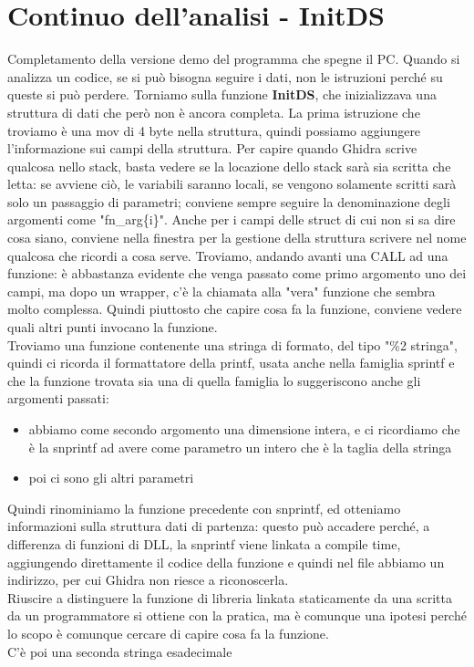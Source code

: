 \documentclass[12pt, oneside]{extbook}
\begin{document}
\section{Continuo dell'analisi - InitDS}
Completamento della versione demo del programma che spegne il PC. Quando si analizza un codice, se si può bisogna seguire i dati, non le istruzioni perché su queste si può perdere. Torniamo sulla funzione \textbf{InitDS}, che inizializzava una struttura di dati che però non è ancora completa. La prima istruzione che troviamo è una mov di 4 byte nella struttura, quindi possiamo aggiungere l'informazione sui campi della struttura. Per capire quando Ghidra scrive qualcosa nello stack, basta vedere se la locazione dello stack sarà sia scritta che letta: se avviene ciò, le variabili saranno locali, se vengono solamente scritti sarà solo un passaggio di parametri; conviene sempre seguire la denominazione degli argomenti come "\textsf{fn\_arg\{i\}}". Anche per i campi delle struct di cui non si sa dire cosa siano, conviene nella finestra per la gestione della struttura scrivere nel nome qualcosa che ricordi a cosa serve. Troviamo, andando avanti una CALL ad una funzione: è abbastanza evidente che venga passato come primo argomento uno dei campi, ma dopo un wrapper, c'è la chiamata alla "vera" funzione che sembra molto complessa. Quindi piuttosto che capire cosa fa la funzione, conviene vedere quali altri punti invocano la funzione. \\ Troviamo una funzione contenente una stringa di formato, del tipo "\%2 stringa", quindi ci ricorda il formattatore della printf, usata anche nella famiglia sprintf e che la funzione trovata sia una di quella famiglia lo suggeriscono anche gli argomenti passati:
\begin{itemize}
\item abbiamo come secondo argomento una dimensione intera, e ci ricordiamo che è la snprintf ad avere come parametro un intero che è la taglia della stringa
\item poi ci sono gli altri parametri
\end{itemize}
Quindi rinominiamo la funzione precedente con snprintf, ed otteniamo informazioni sulla struttura dati di partenza: questo può accadere perché, a differenza di funzioni di DLL, la snprintf viene linkata a compile time, aggiungendo direttamente il codice della funzione e quindi nel file abbiamo un indirizzo, per cui Ghidra non riesce a riconoscerla.\\ Riuscire a distinguere la funzione di libreria linkata staticamente da una scritta da un programmatore si ottiene con la pratica, ma è comunque una ipotesi perché lo scopo è comunque cercare di capire cosa fa la funzione. \\ C'è poi una seconda stringa esadecimale 
\end{document}
